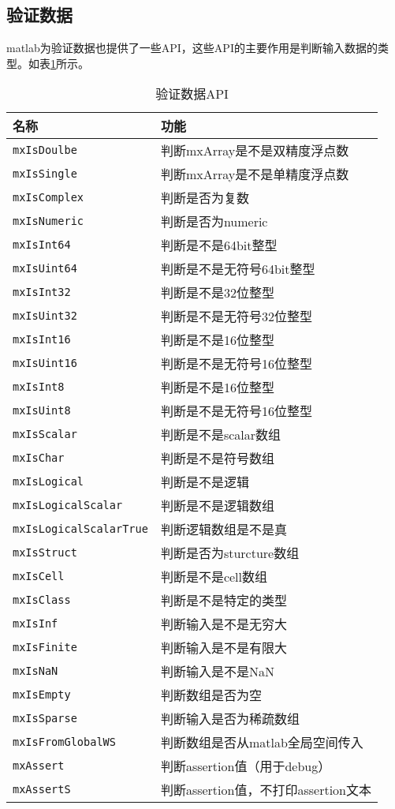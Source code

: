 \documentclass[10pt,a4paper,UTF8]{article}
\begin{document}
\subsection{验证数据}
\label{sec:orgheadline4}


matlab为验证数据也提供了一些API，这些API的主要作用是判断输入数据的类型。如表\ref{tab:orgtable3}所示。
\begin{table}[htb]
\caption{\label{tab:orgtable3}
验证数据API}
\centering
\begin{tabular}{ll}
\hline
名称 & 功能\\
\hline
\texttt{mxIsDoulbe} & 判断mxArray是不是双精度浮点数\\
\texttt{mxIsSingle} & 判断mxArray是不是单精度浮点数\\
\texttt{mxIsComplex} & 判断是否为复数\\
\texttt{mxIsNumeric} & 判断是否为numeric\\
\texttt{mxIsInt64} & 判断是不是64bit整型\\
\texttt{mxIsUint64} & 判断是不是无符号64bit整型\\
\texttt{mxIsInt32} & 判断是不是32位整型\\
\texttt{mxIsUint32} & 判断是不是无符号32位整型\\
\texttt{mxIsInt16} & 判断是不是16位整型\\
\texttt{mxIsUint16} & 判断是不是无符号16位整型\\
\texttt{mxIsInt8} & 判断是不是16位整型\\
\texttt{mxIsUint8} & 判断是不是无符号16位整型\\
\texttt{mxIsScalar} & 判断是不是scalar数组\\
\texttt{mxIsChar} & 判断是不是符号数组\\
\texttt{mxIsLogical} & 判断是不是逻辑\\
\texttt{mxIsLogicalScalar} & 判断是不是逻辑数组\\
\texttt{mxIsLogicalScalarTrue} & 判断逻辑数组是不是真\\
\texttt{mxIsStruct} & 判断是否为sturcture数组\\
\texttt{mxIsCell} & 判断是不是cell数组\\
\texttt{mxIsClass} & 判断是不是特定的类型\\
\texttt{mxIsInf} & 判断输入是不是无穷大\\
\texttt{mxIsFinite} & 判断输入是不是有限大\\
\texttt{mxIsNaN} & 判断输入是不是NaN\\
\texttt{mxIsEmpty} & 判断数组是否为空\\
\texttt{mxIsSparse} & 判断输入是否为稀疏数组\\
\texttt{mxIsFromGlobalWS} & 判断数组是否从matlab全局空间传入\\
\texttt{mxAssert} & 判断assertion值（用于debug）\\
\texttt{mxAssertS} & 判断assertion值，不打印assertion文本\\
\hline
\end{tabular}
\end{table}
\end{document}
